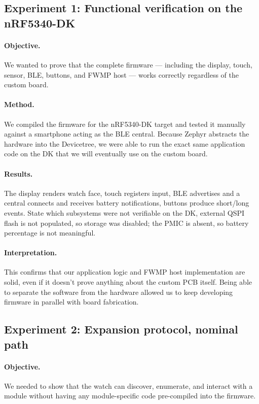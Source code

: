 \documentclass[12pt, a4paper]{article}
\begin{document}
\subsection{Experiment 1: Functional verification on the nRF5340-DK}

\paragraph{Objective.} We wanted to prove that the complete firmware --- including the display, touch, sensor, BLE, buttons, and FWMP host --- works correctly regardless of the custom board.

\paragraph{Method.} We compiled the firmware for the nRF5340-DK target and tested it manually against a smartphone acting as the BLE central. Because Zephyr abstracts the hardware into the Devicetree, we were able to run the exact same application code on the DK that we will eventually use on the custom board.

\paragraph{Results.} The display renders watch face, touch registers input, BLE advertises and a central connects and receives battery
notifications, buttons produce short/long events. State which subsystems were
not verifiable on the DK, external QSPI flash is not populated, so storage
was disabled; the PMIC is absent, so battery percentage is not meaningful.

\paragraph{Interpretation.} This confirms that our application logic and FWMP host implementation are solid, even if it doesn't prove anything about the custom PCB itself. Being able to separate the software from the hardware allowed us to keep developing firmware in parallel with board fabrication.

\subsection{Experiment 2: Expansion protocol, nominal path}

\paragraph{Objective.} We needed to show that the watch can discover, enumerate, and interact with a module without having any module-specific code pre-compiled into the firmware.
\end{document}

